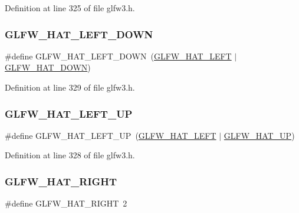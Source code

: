 Definition at line 325 of file glfw3.\+h.

\mbox{\label{group__hat__state_ga76c02baf1ea345fcbe3e8ff176a73e19}} 
\subsubsection{\texorpdfstring{GLFW\_HAT\_LEFT\_DOWN}{GLFW\_HAT\_LEFT\_DOWN}}
{\footnotesize\ttfamily \#define G\+L\+F\+W\+\_\+\+H\+A\+T\+\_\+\+L\+E\+F\+T\+\_\+\+D\+O\+WN~(\mbox{\hyperlink{group__hat__state_gac775f4b3154fdf5db93eb432ba546dff}{G\+L\+F\+W\+\_\+\+H\+A\+T\+\_\+\+L\+E\+FT}}  $\vert$ \mbox{\hyperlink{group__hat__state_gad60d1fd0dc85c18f2642cbae96d3deff}{G\+L\+F\+W\+\_\+\+H\+A\+T\+\_\+\+D\+O\+WN}})}



Definition at line 329 of file glfw3.\+h.

\mbox{\label{group__hat__state_ga638f0e20dc5de90de21a33564e8ce129}} 
\subsubsection{\texorpdfstring{GLFW\_HAT\_LEFT\_UP}{GLFW\_HAT\_LEFT\_UP}}
{\footnotesize\ttfamily \#define G\+L\+F\+W\+\_\+\+H\+A\+T\+\_\+\+L\+E\+F\+T\+\_\+\+UP~(\mbox{\hyperlink{group__hat__state_gac775f4b3154fdf5db93eb432ba546dff}{G\+L\+F\+W\+\_\+\+H\+A\+T\+\_\+\+L\+E\+FT}}  $\vert$ \mbox{\hyperlink{group__hat__state_ga8c9720c76cd1b912738159ed74c85b36}{G\+L\+F\+W\+\_\+\+H\+A\+T\+\_\+\+UP}})}



Definition at line 328 of file glfw3.\+h.

\mbox{\label{group__hat__state_ga252586e3bbde75f4b0e07ad3124867f5}} 
\subsubsection{\texorpdfstring{GLFW\_HAT\_RIGHT}{GLFW\_HAT\_RIGHT}}
{\footnotesize\ttfamily \#define G\+L\+F\+W\+\_\+\+H\+A\+T\+\_\+\+R\+I\+G\+HT~2}



